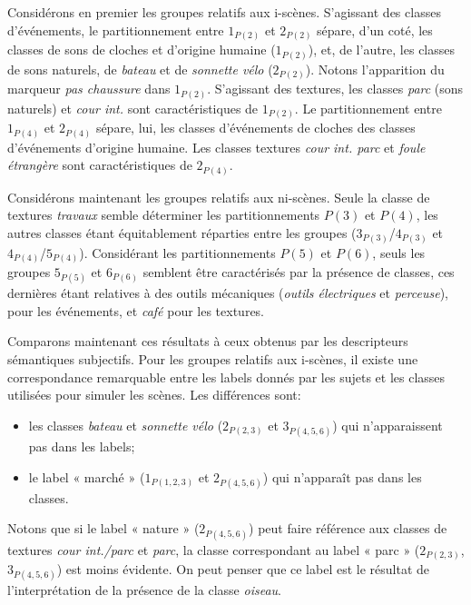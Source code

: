 Considérons en premier les groupes relatifs aux i-scènes. S'agissant des classes d'événements, le partitionnement entre $1_{P(2)}$ et $2_{P(2)}$ sépare, d'un coté, les classes de sons de cloches et d'origine humaine ($1_{P(2)}$), et, de l'autre, les classes de sons naturels, de \emph{bateau} et de \emph{sonnette vélo} ($2_{P(2)}$). Notons l'apparition du marqueur \emph{pas chaussure} dans $1_{P(2)}$. S'agissant des textures, les classes \emph{parc} (sons naturels) et \emph{cour int.} sont caractéristiques de $1_{P(2)}$. Le partitionnement entre  $1_{P(4)}$ et $2_{P(4)}$ sépare, lui, les classes d'événements de cloches des classes d'événements d'origine humaine. Les classes textures \emph{cour int. parc} et \emph{foule étrangère} sont caractéristiques de $2_{P(4)}$.

Considérons maintenant les groupes relatifs aux ni-scènes. Seule la classe de textures \emph{travaux} semble déterminer les partitionnements $P(3)$ et $P(4)$, les autres classes étant équitablement réparties entre les groupes ($3_{P(3)}$/$4_{P(3)}$ et $4_{P(4)}$/$5_{P(4)}$). Considérant les partitionnements  $P(5)$ et $P(6)$, seuls les groupes $5_{P(5)}$ et $6_{P(6)}$ semblent être caractérisés par la présence de classes, ces dernières étant relatives à des outils mécaniques (\emph{outils électriques} et \emph{perceuse}), pour les événements, et \emph{café} pour les textures.

Comparons maintenant ces résultats à ceux obtenus par les descripteurs sémantiques subjectifs. Pour les groupes relatifs aux i-scènes, il existe une correspondance remarquable entre les labels donnés par les sujets et les classes utilisées pour simuler les scènes. Les différences sont:

\begin{itemize}
\item les classes \emph{bateau} et \emph{sonnette vélo} ($2_{P(2,3)}$ et $3_{P(4,5,6)}$) qui n’apparaissent pas dans les labels;
\item le label « marché » ($1_{P(1,2,3)}$ et $2_{P(4,5,6)}$) qui n'apparaît pas dans les classes.
\end{itemize} 

Notons que si le label « nature » ($2_{P(4,5,6)}$) peut faire référence aux classes de textures \emph{cour int./parc} et \emph{parc}, la classe correspondant au label « parc » ($2_{P(2,3)}$, $3_{P(4,5,6)}$) est moins évidente. On peut penser que ce label est le résultat de l'interprétation de la présence de la classe \emph{oiseau}.

